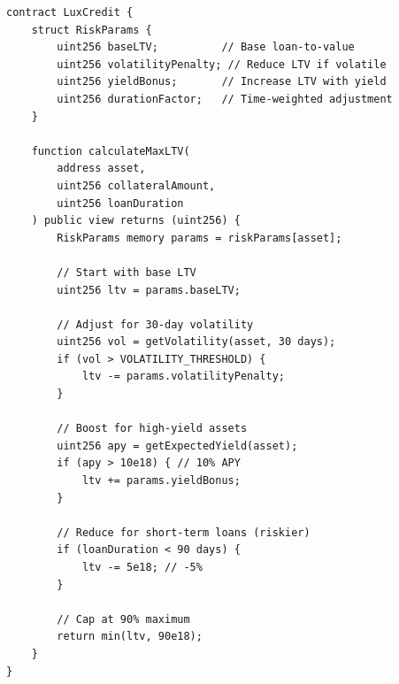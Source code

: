 \begin{lstlisting}[language=Solidity, basicstyle=\small\ttfamily]
contract LuxCredit {
    struct RiskParams {
        uint256 baseLTV;          // Base loan-to-value
        uint256 volatilityPenalty; // Reduce LTV if volatile
        uint256 yieldBonus;       // Increase LTV with yield
        uint256 durationFactor;   // Time-weighted adjustment
    }
    
    function calculateMaxLTV(
        address asset,
        uint256 collateralAmount,
        uint256 loanDuration
    ) public view returns (uint256) {
        RiskParams memory params = riskParams[asset];
        
        // Start with base LTV
        uint256 ltv = params.baseLTV;
        
        // Adjust for 30-day volatility
        uint256 vol = getVolatility(asset, 30 days);
        if (vol > VOLATILITY_THRESHOLD) {
            ltv -= params.volatilityPenalty;
        }
        
        // Boost for high-yield assets
        uint256 apy = getExpectedYield(asset);
        if (apy > 10e18) { // 10% APY
            ltv += params.yieldBonus;
        }
        
        // Reduce for short-term loans (riskier)
        if (loanDuration < 90 days) {
            ltv -= 5e18; // -5%
        }
        
        // Cap at 90% maximum
        return min(ltv, 90e18);
    }
}
\end{lstlisting}

